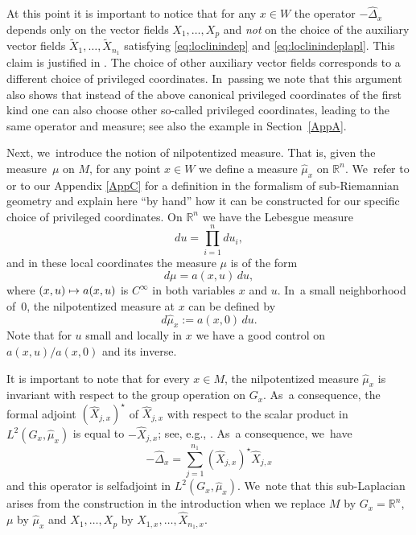 \documentclass[11pt]{article}
\newcommand\mto{\mathchoice{\longmapsto}{\mapsto}{\mapsto}{\mapsto}}
\theoremstyle{definition}
\newcommand{\1}{\mathbbm{1}}
\newcommand{\R}{\mathbb{R}}
\numberwithin{equation}{section}
\begin{document}
At this point it is important to notice that for any $x\in W$ the operator $-\widehat\Delta_x$ depends only on the vector fields $X_1,\ldots,X_p$ and \emph{not} on the choice of the auxiliary vector fields $\tilde X_1,\ldots,\tilde X_{n_1}$ satisfying \eqref{eq:loclinindep} and \eqref{eq:loclinindeplapl}. This claim is justified in \hbox{\cite[\S A.5.4]{CHT1}}. The choice of other auxiliary vector fields corresponds to a different choice of privileged coordinates. In~passing we note that this argument also shows that instead of the above canonical privileged coordinates of the first kind one can also choose other so-called privileged coordinates, leading to the same operator and measure; see also the example in Section~\ref{AppA}.

Next, we~introduce the notion of nilpotentized measure. That is, given the measure~$\mu$ on $M$, for any point $x\in W$ we define a measure $\widehat \mu_x$ on $\R^n$. We~refer to \cite[App.\,A.5.6]{CHT1} or to our Appendix \ref{AppC} for a definition in the formalism of sub-Riemannian geometry and explain here ``by hand'' how it can be constructed for our specific choice of privileged coordinates.
On $\mathbb R^n$ we have the Lebesgue measure
\[
du= \prod_{i=1}^n du_{i},
\]
and in these local coordinates the measure $\mu$ is of the form
\[
d\mu = a(x,u) \,du,
\]
where $(x,u)\mto a(x,u)$ is $C^\infty$ in both variables $x$ and $u$. In~a small neighborhood of~$0$, the nilpotentized measure at $x$ can be defined by
\begin{equation}\label{eq:nilpmeas}
d\widehat \mu_x:= a(x,0) \,du.
\end{equation}
Note that for $u$ small and locally in $x$ we have a good control on $a(x,u)/a(x,0)$ and its inverse.

It is important to note that for every $x\in M$, the nilpotentized measure $\widehat\mu_x$ is invariant with respect to the group operation on $G_x$. As~a consequence, the formal adjoint $(\widehat X_{j,x})^\star$ of $\widehat X_{j,x}$ with respect to the scalar product in $L^2(G_x,\widehat\mu_x)$ is equal to $-\widehat X_{j,x}$; see, e.g., \cite[Rem.\,A.5]{CHT1}. As~a consequence, we~have
\[
-\widehat \Delta_x = \sum_{j=1}^{n_1} (\widehat X_{j,x})^\star \widehat X_{j,x}
\]
and this operator is selfadjoint in $L^2(G_x,\widehat\mu_x)$. We~note that this sub-Laplacian arises from the construction in the introduction when we replace $M$ by $G_x=\R^n$, $\mu$ by $\widehat\mu_x$ and $X_1,\ldots,X_p$ by $\widehat X_{1,x},\ldots,\widehat X_{n_1,x}$.
\end{document}
